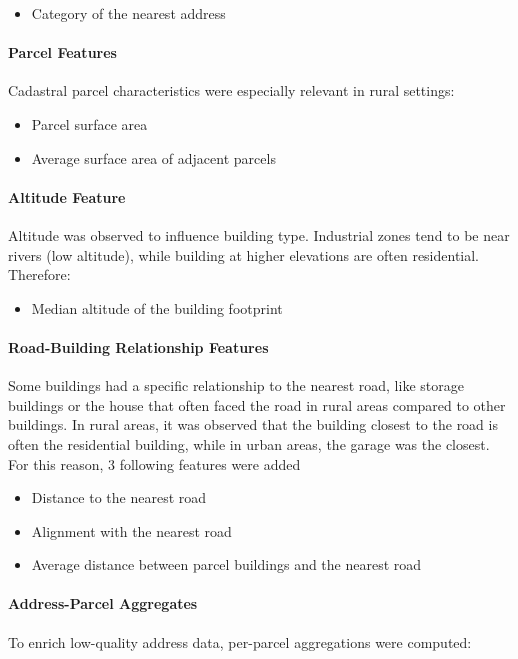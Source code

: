 \documentclass[11pt]{article}
\begin{document}
\begin{itemize}
    \item Category of the nearest address
\end{itemize}

\paragraph{Parcel Features}
Cadastral parcel characteristics were especially relevant in rural settings:

\begin{itemize}
    \item Parcel surface area
    \item Average surface area of adjacent parcels
\end{itemize}

\paragraph{Altitude Feature}
Altitude was observed to influence building type. Industrial zones tend to be near rivers (low altitude), while building at higher elevations are often residential. Therefore:

\begin{itemize}
    \item Median altitude of the building footprint
\end{itemize}

\paragraph{Road-Building Relationship Features}
Some buildings had a specific relationship to the nearest road, like storage buildings or the house that often faced the road in rural areas compared to other buildings. In rural areas, it was observed that the building closest to the road is often the residential building, while in urban areas, the garage was the closest. For this reason, 3 following features were added

\begin{itemize}
    \item Distance to the nearest road
    \item Alignment with the nearest road
    \item Average distance between parcel buildings and the nearest road
\end{itemize}

\paragraph{Address-Parcel Aggregates}
To enrich low-quality address data, per-parcel aggregations were computed:
\end{document}
